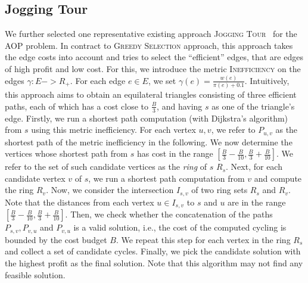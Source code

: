 \documentclass[sigconf,natbib=false]{acmart}
\newcommand{\greedy}{\textsc{Greedy Selection}\xspace}
\newcommand{\jogging}{\textsc{Jogging Tour}\xspace}
\newcommand{\AOP}{\textsc{AOP}\xspace}
\begin{document}
\subsection{Jogging Tour}\label{alg:jogging}
We further selected one representative existing approach \jogging~\cite{jogging} for the \AOP problem.
In contract to \greedy approach, this approach takes the edge costs into account and tries to select the ``efficient'' edges, that are edges of high profit and low cost. 
For this, we introduce the metric \textsc{Inefficiency} \xspace on the edges $\gamma: E-> R_{+}$. For each edge $e \in E$, we set $\gamma(e) = \frac{w(e)}{\pi(e) + 0.1}$.
Intuitively, this approach aims to obtain an equilateral triangles consisting of three efficient paths, each of which has a cost close to  $\frac{B}{3}$, and having $s$ as one of the triangle's edge. Firstly, we run a shortest path computation (with Dijkstra’s algorithm) from $s$
using this metric inefficiency.
For each vertex $u,v$, we refer to $P_{u,v}$ as the shortest path of the metric inefficiency in the following.   
We now determine the vertices whose shortest path from $s$ has cost in the range $[\frac{B}{3}- \frac{B}{10} , \frac{B}{3} + \frac{B}{10}]$. We refer to the set of such candidate vertices as the \textit{ring} of $s$ $R_s$.
Next, for each candidate vertex $v$ of $s$, we run a shortest path computation from $v$ and compute the ring $R_v$. Now, we consider the intersection $I_{s,v}$ of two ring sets $R_s$ and $R_v$. Note that the distances from each vertex $u\in I_{s,v}$ to $s$ and $u$ are in the range $[\frac{B}{3}- \frac{B}{10} , \frac{B}{3} + \frac{B}{10}]$. Then, we check whether the concatenation of the paths $P_{s,v}, P_{v,u}$ and $P_{v,u}$ is a valid solution, i.e., the cost of the computed cycling is bounded by the cost budget $B$. 
We repeat this step for each vertex in the ring $R_s$ and collect a set of candidate cycles. 
Finally, we pick the candidate solution with the highest profit as the final solution.
Note that this algorithm may not find any feasible solution.
\end{document}
